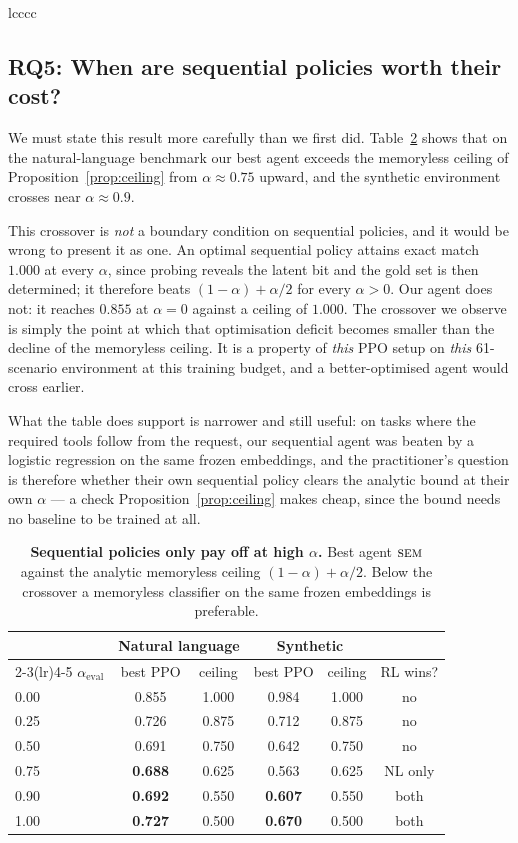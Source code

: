 \documentclass[11pt]{article}
\newcommand{\sem}{\ensuremath{\text{\textsc{sem}}}}
\begin{document}
\begin{table}[t]
\begin{tabular}{lcccc}
\subsection{RQ5: When are sequential policies worth their cost?}
\label{sec:crossover}

We must state this result more carefully than we first did.
Table~\ref{tab:crossover} shows that on the natural-language benchmark our best
agent exceeds the memoryless ceiling of Proposition~\ref{prop:ceiling} from
$\alpha \approx 0.75$ upward, and the synthetic environment crosses near
$\alpha \approx 0.9$.

This crossover is \emph{not} a boundary condition on sequential policies, and it
would be wrong to present it as one. An optimal sequential policy attains exact
match $1.000$ at every $\alpha$, since probing reveals the latent bit and the gold
set is then determined; it therefore beats $(1-\alpha) + \alpha/2$ for every
$\alpha > 0$. Our agent does not: it reaches $0.855$ at $\alpha=0$ against a
ceiling of $1.000$. The crossover we observe is simply the point at which that
optimisation deficit becomes smaller than the decline of the memoryless ceiling.
It is a property of \emph{this} PPO setup on \emph{this} 61-scenario environment
at this training budget, and a better-optimised agent would cross earlier.

What the table does support is narrower and still useful: on tasks where the
required tools follow from the request, our sequential agent was beaten by a
logistic regression on the same frozen embeddings, and the practitioner's question
is therefore whether their own sequential policy clears the analytic bound at
their own $\alpha$ --- a check Proposition~\ref{prop:ceiling} makes cheap, since
the bound needs no baseline to be trained at all.

\begin{table}[t]
\centering
\caption{\textbf{Sequential policies only pay off at high $\alpha$.} Best agent
\sem{} against the analytic memoryless ceiling $(1-\alpha)+\alpha/2$. Below the
crossover a memoryless classifier on the same frozen embeddings is preferable.}
\label{tab:crossover}
\begin{tabular}{lccccc}
\toprule
& \multicolumn{2}{c}{Natural language} & \multicolumn{2}{c}{Synthetic} & \\
\cmidrule(lr){2-3}\cmidrule(lr){4-5}
$\alpha_{\text{eval}}$ & best PPO & ceiling & best PPO & ceiling & RL wins? \\
\midrule
0.00 & 0.855 & 1.000 & 0.984 & 1.000 & no \\
0.25 & 0.726 & 0.875 & 0.712 & 0.875 & no \\
0.50 & 0.691 & 0.750 & 0.642 & 0.750 & no \\
0.75 & \textbf{0.688} & 0.625 & 0.563 & 0.625 & NL only \\
0.90 & \textbf{0.692} & 0.550 & \textbf{0.607} & 0.550 & both \\
1.00 & \textbf{0.727} & 0.500 & \textbf{0.670} & 0.500 & both \\
\bottomrule
\end{tabular}
\end{table}


\end{tabular}
\end{table}
\end{document}
